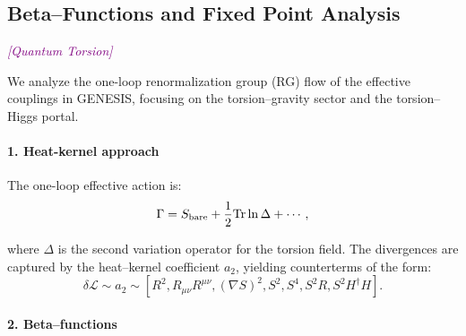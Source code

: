 \documentclass{article}
\newcommand{\quantumtag}{\textcolor{purple}{\textit{[Quantum Torsion]}}}
\begin{document}
\medskip
\begin{center}
\end{center}
\medskip


\subsection{Beta–Functions and Fixed Point Analysis}
\label{sec:beta_functions}
\quantumtag


We analyze the one-loop renormalization group (RG) flow of the effective couplings in GENESIS, focusing on the torsion–gravity sector and the torsion–Higgs portal.

\paragraph{1. Heat-kernel approach}

The one-loop effective action is:
\begin{equation}
\Gamma = S_{\rm bare} + \frac{1}{2} \mathrm{Tr} \ln \Delta + \cdots,
\end{equation}

where \( \Delta \) is the second variation operator for the torsion field. The divergences are captured by the heat–kernel coefficient \( a_2 \), yielding counterterms of the form:
\begin{equation}\label{eq:auto84}
\delta \mathcal{L} \sim a_2 \sim \left[ R^2, R_{\mu\nu}R^{\mu\nu}, (\nabla S)^2, S^2, S^4, S^2 R, S^2 H^\dagger H \right].
\end{equation}

\paragraph{2. Beta–functions}
\end{document}
